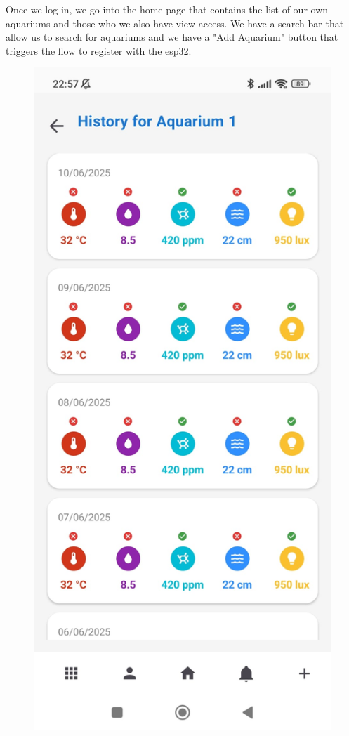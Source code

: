 \documentclass[11pt,a4paper]{article}
\begin{document}
\vspace{2em}

Once we log in, we go into the home page that contains the list of our own aquariums and those who we also have view access. We have a search bar that allow us to search for aquariums and we have a "Add Aquarium" button that triggers the flow to register with the esp32.


\begin{figure}[H]
    \centering
    \begin{minipage}{0.35\textwidth}
        \centering
        \includegraphics[width=\linewidth]{Images/Aquarium history.jpeg}

\end{minipage}
\end{figure}
\end{document}
